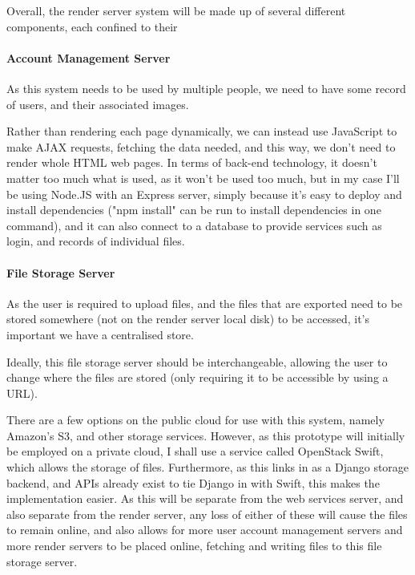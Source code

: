 \documentclass[12pt,a4paper]{article}
\begin{document}
Overall, the render server system will be made up of several different components, each
confined to their
\paragraph{Account Management Server}
As this system needs to be used by multiple people, we need to have some record of users,
and their associated images.

Rather than rendering each page dynamically, we can instead use JavaScript to make AJAX requests,
fetching the data needed, and this way, we don't need to render whole HTML web pages. In terms of
back-end technology, it doesn't matter too much what is used, as it won't be used too much, but
in my case I'll be using Node.JS with an Express server, simply because it's easy to deploy and
install dependencies ("npm install" can be run to install dependencies in one command), and it can
also connect to a database to provide services such as login, and records of individual files.

\paragraph{File Storage Server}
As the user is required to upload files, and the files that are exported need to be stored
somewhere (not on the render server local disk) to be accessed, it's important we have a
centralised store.

Ideally, this file storage server should be interchangeable, allowing the user to change
where the files are stored (only requiring it to be accessible by using a URL).

There are a few options on the public cloud for use with this system, namely Amazon's S3,
and other storage services. However, as this prototype will initially be employed on a
private cloud, I shall use a service called OpenStack Swift, which allows the storage of files.
Furthermore, as this links in as a Django storage backend, and APIs already exist to tie Django in
with Swift, this makes the implementation easier. As this will be separate from the web services server,
and also separate from the render server, any loss of either of these will cause the files to remain online,
and also allows for more user account management servers and more render servers to be placed online,
fetching and writing files to this file storage server.

\end{document}
